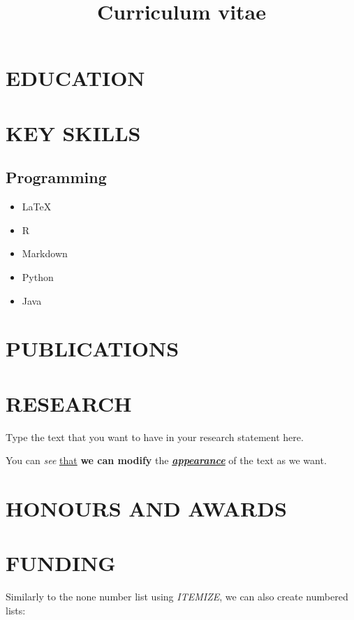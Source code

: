 \documentclass[11pt, a4paper]{moderncv} %
\title{Curriculum vitae}
\begin{document}
 
\maketitle

\section{EDUCATION}
\closesection{}

\section{KEY SKILLS}
	\subsection{Programming}
		\begin{multicols}{3}
		\begin{itemize}
			\item{\LaTeX}
			\item{R}
			\item{Markdown}
			\item{Python}
			\item{Java}
		\end{itemize}
		\end{multicols}
		
\closesection{}

\section{PUBLICATIONS}%
	\nocite{*}
	\printbibliography[heading=none]
\closesection

\section{RESEARCH}
Type the text that you want to have in your research statement here.
\par %
You can \textit{see} \underline{that} \textbf{we can modify} the \textbf{\underline{\textit{appearance}}} of the text as we want.
\closesection

\section{HONOURS AND AWARDS}
\section{FUNDING}
Similarly to the none number list using \textit{ITEMIZE}, we can also create numbered lists:
\end{document}
